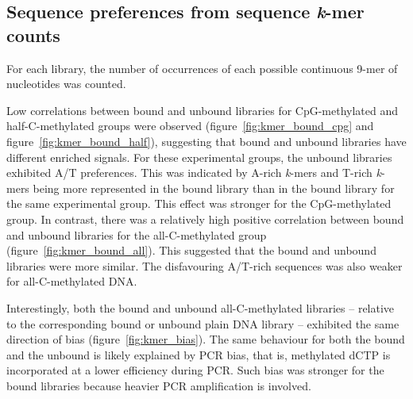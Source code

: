 \documentclass[a4paper, numbers=noenddot]{scrbook}
\begin{document}
\subsection{Sequence preferences from sequence \emph{k}-mer counts}
\label{ssec:nuseqpref_kmer}

For each library, the number of occurrences of each possible continuous 9-mer of nucleotides was counted.

Low correlations between bound and unbound libraries for CpG-methylated and half-C-methylated groups were observed (figure~\ref{fig:kmer_bound_cpg} and figure~\ref{fig:kmer_bound_half}), suggesting that bound and unbound libraries have different enriched signals.  For these experimental groups, the unbound libraries exhibited A/T preferences.  This was indicated by A-rich \emph{k}-mers and T-rich \emph{k}-mers being more represented in the bound library than in the bound library for the same experimental group.  This effect was stronger for the CpG-methylated group.  In contrast, there was a relatively high positive correlation between bound and unbound libraries for the all-C-methylated group (figure~\ref{fig:kmer_bound_all}).  This suggested that the bound and unbound libraries were more similar. The disfavouring A/T-rich sequences was also weaker for all-C-methylated DNA.

Interestingly, both the bound and unbound all-C-methylated libraries -- relative to the corresponding bound or unbound plain DNA library -- exhibited the same direction of bias (figure~\ref{fig:kmer_bias}).  The same behaviour for both the bound and the unbound is likely explained by PCR bias, that is, methylated dCTP is incorporated at a lower efficiency during PCR.  Such bias was stronger for the bound libraries because heavier PCR amplification is involved. %
\end{document}
